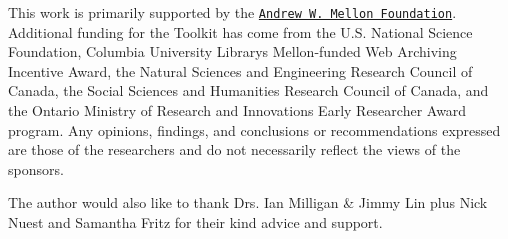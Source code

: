 This work is primarily supported by the \href{https://uwaterloo.ca/arts/news/multidisciplinary-project-will-help-historians-unlock}{\tt Andrew W. Mellon Foundation}. Additional funding for the Toolkit has come from the U.\+S. National Science Foundation, Columbia University Library\textquotesingle{}s Mellon-\/funded Web Archiving Incentive Award, the Natural Sciences and Engineering Research Council of Canada, the Social Sciences and Humanities Research Council of Canada, and the Ontario Ministry of Research and Innovation\textquotesingle{}s Early Researcher Award program. Any opinions, findings, and conclusions or recommendations expressed are those of the researchers and do not necessarily reflect the views of the sponsors.

The author would also like to thank Drs. Ian Milligan \& Jimmy Lin plus Nick Nuest and Samantha Fritz for their kind advice and support. 